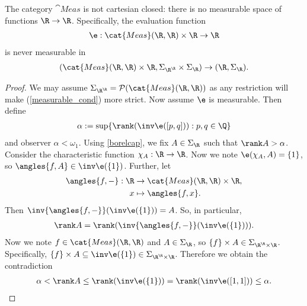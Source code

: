 \documentclass{article}
\begin{document}
\begin{theorem}[Aumann, 1961]
	The category $\cat{Meas}$ is not cartesian closed: there is no measurable space of functions $\R\to\R$.
	Specifically, the evaluation function
	\begin{align*}
		\e : \cat{Meas}(\R,\R) \times \R \to \R
	\end{align*}
	is never measurable in
	\begin{align*}
		(\cat{Meas}(\R,\R)\times\R,\Sigma_{\R^\R}\times \Sigma_\R) \to (\R, \Sigma_\R).
	\end{align*}
	\begin{proof}
		We may assume $\Sigma_{\R^\R}=\mathcal{P}(\cat{Meas}(\R,\R))$ as any restriction will make
		(\ref{measurable_cond}) more strict.
		Now assume $\e$ is measurable. Then define
		\begin{align*}
			\alpha := \sup\{\rank(\inv\e([p,q])):p,q\in\Q\}
		\end{align*}
		and observer $\alpha<\omega_1$.
		Using \ref{borelcap}, we fix $A\in \Sigma_\R$ such that $\rank A>\alpha$.
		Consider the characteristic function $\chi_A:\R\to\R$. Now we note
		$\e(\chi_A,A)=\{1\}$, so $\angles{f,A}\in\inv\e(\{1\})$. Further, let
		\begin{align*}
			\angles{f,-}:\R & \to\cat{Meas}(\R,\R)\times\R, \\
			x               & \mapsto \angles{f,x}.
		\end{align*}
		Then $\inv{\angles{f,-}}(\inv\e(\{1\}))=A$. So, in particular,
		\begin{align*}
			\rank A = \rank(\inv{\angles{f,-}}(\inv\e(\{1\}))).
		\end{align*}
		Now we note $f\in\cat{Meas}(\R,\R)$ and $A\in \Sigma_\R$, so $\{f\}\times A\in \Sigma_{\R^\R\times\R}$.
		Specifically, $\{f\}\times A\subseteq\inv\e(\{1\})\in \Sigma_{\R^\R\times\R}$. Therefore
		we obtain the contradiction
		\begin{align*}
			\alpha<\rank A \leq \rank(\inv\e(\{1\}))=\rank(\inv\e([1,1]))\leq \alpha.
		\end{align*}

	\end{proof}
\end{theorem}
\end{document}
